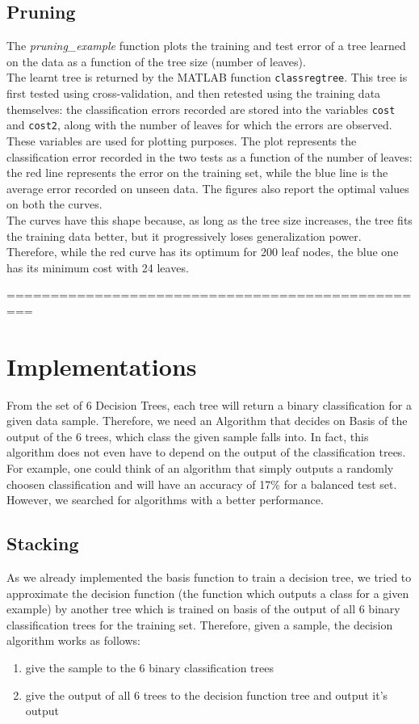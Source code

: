 \documentclass{article}
\begin{document}
\subsection{Pruning}
The \emph{pruning\_example} function plots the training and test error of a tree learned on the data as a function of the tree size (number of leaves).\\
The learnt tree is returned by the MATLAB function \verb$classregtree$. This tree is first tested using cross-validation, and then retested using the training data themselves: the classification errors recorded are stored into the variables \verb$cost$ and \verb$cost2$, along with the number of leaves for which the errors are observed. These variables are used for plotting purposes.
The plot represents the classification error recorded in the two tests as a function of the number of leaves: the red line represents the error on the training set, while the blue line is the average error recorded on unseen data. The figures also report the optimal values on both the curves.\\
The curves have this shape because, as long as the tree size increases, the tree fits the training data better, but it progressively loses generalization power. Therefore, while the red curve has its optimum for 200 leaf nodes, the blue one has its minimum cost with 24 leaves.



=================================================
\section{Implementations}
From the set of 6 Decision Trees, each tree will return a binary classification for a given data sample. Therefore, we need an Algorithm that decides on Basis of the output of the 6 trees, which class the given sample falls into. In fact, this algorithm does not even have to depend on the output of the classification trees. For example, one could think of an algorithm that simply outputs a randomly choosen classification and will have an accuracy of 17\% for a balanced test set. However, we searched for algorithms with a better performance.


\subsection{Stacking}
As we already implemented the basis function to train a decision tree, we tried to approximate the decision function (the function which outputs a class for a given example) by another tree which is trained on basis of the output of all 6 binary classification trees for the training set.
Therefore, given a sample, the decision algorithm works as follows:
\begin{enumerate}
    \item give the sample to the 6 binary classification trees
    \item give the output of all 6 trees to the decision function tree and output it's output
\end{enumerate} 
\end{document}
